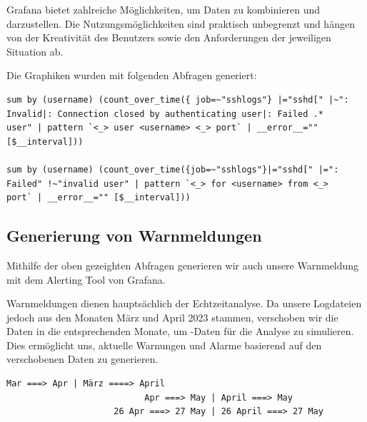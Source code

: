 Grafana bietet zahlreiche Möglichkeiten, um Daten zu kombinieren und darzustellen. Die Nutzungsmöglichkeiten sind praktisch unbegrenzt und hängen von der Kreativität des Benutzers sowie den Anforderungen der jeweiligen Situation ab.

Die Graphiken wurden mit folgenden Abfragen generiert:

{
\begin{Verbatim}[frame=single]
sum by (username) (count_over_time({ job=~"sshlogs"} |="sshd[" |~": 
Invalid|: Connection closed by authenticating user|: Failed .* 
user" | pattern `<_> user <username> <_> port` | __error__="" 
[$__interval]))

sum by (username) (count_over_time({job=~"sshlogs"}|="sshd[" |=": 
Failed" !~"invalid user" | pattern `<_> for <username> from <_> 
port` | __error__="" [$__interval]))
\end{Verbatim}
}

\subsection{Generierung von Warnmeldungen}

Mithilfe der oben gezeighten Abfragen generieren wir auch unsere Warnmeldung mit dem Alerting Tool von Grafana.

Warnmeldungen dienen hauptsächlich der Echtzeitanalyse. Da unsere Logdateien jedoch aus den Monaten März und April 2023 stammen, verschoben wir die Daten in die entsprechenden Monate, um  -Daten für die Analyse zu simulieren. Dies ermöglicht uns, aktuelle Warnungen und Alarme basierend auf den verschobenen Daten zu generieren.

\begin{center}
{
\begin{Verbatim}[frame=single]
                           Mar ===> Apr | März ====> April
                           Apr ===> May | April ===> May
                     26 Apr ===> 27 May | 26 April ===> 27 May
\end{Verbatim}
}
\end{center}


